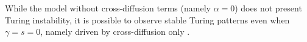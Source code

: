 \documentclass[a4paper,10pt,abstract=true,parskip=true]{scrartcl}
\theoremstyle{remark}
\numberwithin{equation}{section}
\numberwithin{thm}{section}
\begin{document}
While the model without cross-diffusion terms (namely $\alpha=0$) does not present Turing instability, it is possible to observe stable Turing patterns even when $\gamma = s = 0$, namely driven by cross-diffusion only \cite{GIS_2026}.

\end{document}

